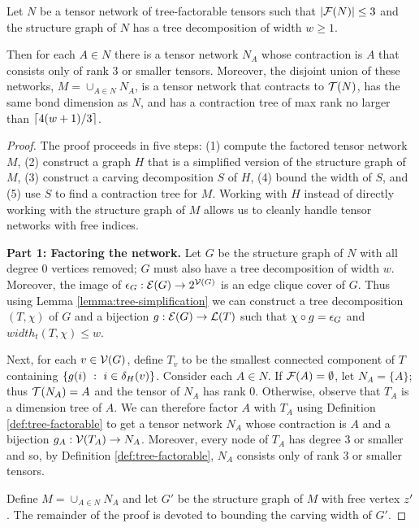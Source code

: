 \begin{theorem} \label{thm:factorable-tree}
Let $N$ be a tensor network of tree-factorable tensors such that $|\mathcal{F}(N)| \leq 3$ and the structure graph of $N$ has a tree decomposition of width $w \geq 1$.

Then for each $A \in N$ there is a tensor network $N_A$ whose contraction is $A$ that consists only of rank 3 or smaller tensors. Moreover, the disjoint union of these networks, $M = \cup_{A \in N} N_A$, is a tensor network that contracts to $\mathcal{T}(N)$, has the same bond dimension as $N$, and has a contraction tree of max rank no larger than $\lceil4(w+1)/3\rceil$.
\end{theorem}
\begin{proof}
The proof proceeds in five steps: (1) compute the factored tensor network $M$, (2) construct a graph $H$ that is a simplified version of the structure graph of $M$, (3) construct a carving decomposition $S$ of $H$, (4) bound the width of $S$, and (5) use $S$ to find a contraction tree for $M$. Working with $H$ instead of directly working with the structure graph of $M$ allows us to cleanly handle tensor networks with free indices.

\textbf{Part 1: Factoring the network.}
Let $G$ be the structure graph of $N$ with all degree 0 vertices removed; $G$ must also have a tree decomposition of width $w$. Moreover, the image of $\epsilon_{G}: \mathcal{E}(G) \rightarrow 2^{\mathcal{V}(G)}$ is an edge clique cover of $G$. Thus using Lemma \ref{lemma:tree-simplification} we can construct a tree decomposition $(T, \chi)$ of $G$ and a bijection $g: \mathcal{E}(G) \rightarrow \mathcal{L}(T)$ such that $\chi \circ g = \epsilon_{G}$ and $width_t(T, \chi) \leq w$.

Next, for each $v \in \mathcal{V}(G)$, define $T_v$ to be the smallest connected component of $T$ containing $\{g(i) ~:~i \in \delta_{H}(v) \}$. Consider each $A \in N$. If $\mathcal{F}(A) = \emptyset$, let $N_A = \{A\}$; thus $\mathcal{T}(N_A) = A$ and the tensor of $N_A$ has rank 0. Otherwise, observe that $T_A$ is a dimension tree of $A$. We can therefore factor $A$ with $T_A$ using Definition \ref{def:tree-factorable} to get a tensor network $N_A$ whose contraction is $A$ and a bijection $g_A: \mathcal{V}(T_A) \rightarrow N_A$. Moreover, every node of $T_A$ has degree 3 or smaller and so, by Definition \ref{def:tree-factorable}, $N_A$ consists only of rank 3 or smaller tensors.

Define $M = \cup_{A \in N} N_A$ and let $G'$ be the structure graph of $M$ with free vertex $z'$. The remainder of the proof is devoted to bounding the carving width of $G'$.


\end{proof}
